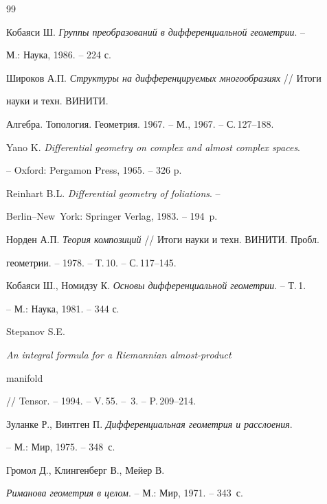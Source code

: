 \begin{thebibliography}{99} 


 




Кобаяси Ш. {\em Группы преобразований в дифференциальной геометрии}. -- 


М.: Наука, 1986. -- 224 с. 




Широков А.П. {\em Структуры на дифференцируемых многообразиях} // Итоги 


науки и техн. ВИНИТИ. 


Алгебра. Топология. Геометрия. 1967. -- М., 1967. -- С.\,127--188. 




Yano K. {\em Differential geometry on complex and almost complex spaces}. 


-- Oxford: Pergamon Press, 1965. -- 326 p. 




Reinhart B.L. {\em Differential geometry of foliations}. -- 


Berlin--New~York: Springer Verlag, 1983. -- 194~p. 




Норден А.П. {\em Теория композиций} // Итоги науки и техн. ВИНИТИ. Пробл. 


геометрии. -- 1978. -- Т.\,10. -- С.\,117--145. 




Кобаяси Ш., Номидзу К. {\em Основы дифференциальной геометрии}. -- Т.\,1. 


-- М.: Наука, 1981. -- 344 с. 




Stepanov S.E. {\em An integral formula for a Riemannian almost-product 


manifold} 


// Tensor. -- 1994. -- V.\,55. -- \No\,3. -- P.\,209--214. 




Зуланке Р., Винтген П. {\em Дифференциальная геометрия и расслоения}. 


-- М.: Мир, 1975. -- 348~с. 




Громол Д., Клингенберг В., Мейер В. 


{\em Риманова геометрия в целом}. -- М.: Мир, 1971. -- 343~с. 



\end{thebibliography}
